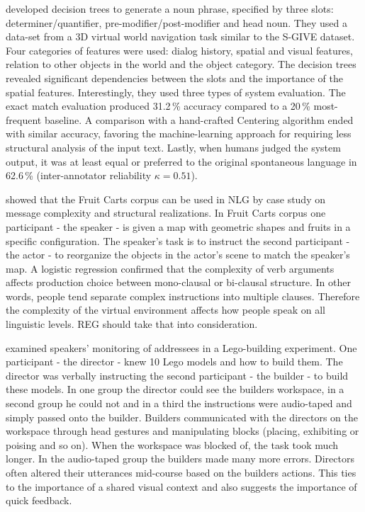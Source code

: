 \citet{stoia2006noun} developed decision trees to generate a noun phrase, specified by three slots: determiner/quantifier, pre-modifier/post-modifier and head noun. They used a data-set from a 3D virtual world navigation task similar to the S-GIVE dataset. Four categories of features were used: dialog history, spatial and visual features, relation to other objects in the world and the object category. The decision trees revealed significant dependencies between the slots and the importance of the spatial features. Interestingly, they used three types of system evaluation. The exact match evaluation produced 31.2\,\% accuracy compared to a 20\,\% most-frequent baseline. A comparison with a hand-crafted Centering algorithm \citep{kibble2000integrated} ended with similar accuracy, favoring the machine-learning approach for requiring less structural analysis of the input text. Lastly, when humans judged the system output, it was at least equal or preferred to the original spontaneous language in 62.6\,\% (inter-annotator reliability $\kappa = 0.51$).

\citet{gallo2008production} showed that the Fruit Carts corpus can be used in NLG by case study on message complexity and structural realizations. In Fruit Carts corpus one participant - the speaker - is given a map with geometric shapes and fruits in a specific configuration. The speaker's task is to instruct the second participant - the actor - to reorganize the objects in the actor's scene to match the speaker's map. A logistic regression confirmed that the complexity of verb arguments affects production choice between mono-clausal or bi-clausal structure. In other words, people tend separate complex instructions into multiple clauses. Therefore the complexity of the virtual environment affects how people speak on all linguistic levels. REG should take that into consideration.

\citet{clark2004speaking} examined speakers' monitoring of addressees in a Lego-building experiment. One participant - the director - knew 10 Lego models and how to build them. The director was verbally instructing the second participant - the builder - to build these models. In one group the director could see the builders workspace, in a second group he could not and in a third the instructions were audio-taped and simply passed onto the builder. Builders communicated with the directors on the workspace through head gestures and manipulating blocks (placing, exhibiting or poising and so on). When the workspace was blocked of, the task took much longer. In the audio-taped group the builders made many more errors. Directors often altered their utterances mid-course based on the builders actions. This ties to the importance of a shared visual context and also suggests the importance of quick feedback. 

